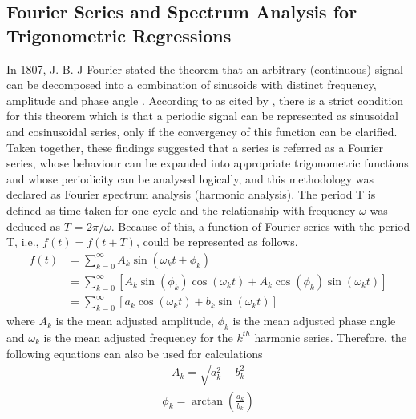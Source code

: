 \documentclass[12pt,msc]{uom_eee_dissertation_casson}
\begin{document}
\subsection{Fourier Series and Spectrum Analysis for Trigonometric Regressions}
\label{sec:fourier-series-spectrum}
In 1807, J. B. J Fourier stated the theorem that an arbitrary (continuous) signal can be decomposed into a combination of sinusoids with distinct frequency, amplitude and phase angle \citep{baron1878analytical}. According to \citet{LejeuneDirichlet1850} as cited by \citet{Barreira2012}, there is a strict condition for this theorem which is that a periodic signal can be represented as sinusoidal and cosinusoidal series, only if the convergency of this function can be clarified. Taken together, these findings suggested that a series is referred as a Fourier series, whose behaviour can be expanded into appropriate trigonometric functions and whose periodicity can be analysed logically, and this methodology was declared as Fourier spectrum analysis (harmonic analysis)\citep{bloomfield2004fourier}. The period T is defined as time taken for one cycle and the relationship with frequency $\omega$ was deduced as $T$ = $2\pi/\omega$. Because of this, a function of Fourier series with the period T, i.e., $f(t)=f(t+T)$, could be represented as follows.
\begin{equation}
\label{eq:1-1}
\begin{aligned}
f(t)&=\sum_{k=0}^{\infty}A_{k}\sin(\omega_{k}t+\phi_{k})\\
    &=\sum_{k=0}^{\infty}[A_{k}\sin(\phi_{k})\cos(\omega_{k}t)+A_{k}\cos(\phi_{k})\sin(\omega_{k}t)]\\
    &=\sum_{k=0}^{\infty}[a_{k}\cos(\omega_{k}t)+b_{k}\sin(\omega_{k}t)]
\end{aligned}
\end{equation}
where $A_{k}$ is the mean adjusted amplitude, $\phi _{k}$ is the mean adjusted phase angle and $\omega_{k}$ is the mean adjusted frequency for the $k^{th}$ harmonic series. Therefore, the following equations can also be used for calculations
\begin{equation}
\label{eq:1-2}
\begin{aligned}
A_{k}=\sqrt{a_{k}^{2}+b_{k}^{2}}
\end{aligned}
\end{equation}
\begin{equation}
\label{eq:1-3}
\begin{aligned}
\phi_{k}=\arctan(\frac{a_{k}}{b_{k}})
\end{aligned}
\end{equation}
\end{document}
